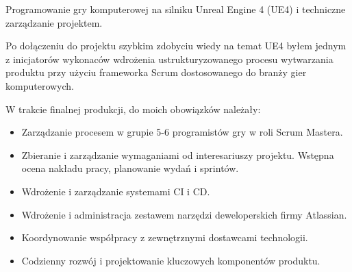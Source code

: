 \begin{rubric}{}
{	Programowanie gry komputerowej na silniku Unreal Engine 4 (UE4) i techniczne zarządzanie projektem.

	Po dołączeniu do projektu szybkim zdobyciu wiedy na temat UE4 byłem jednym z inicjatorów wykonaców
	wdrożenia ustrukturyzowanego procesu wytwarzania produktu przy użyciu frameworka Scrum dostosowanego
	do branży gier komputerowych.

	W trakcie finalnej produkcji, do moich obowiązków należały:
	\begin{itemize}
		\item Zarządzanie procesem w grupie 5-6 programistów gry w roli Scrum Mastera.
		\item Zbieranie i zarządzanie wymaganiami od interesariuszy projektu. Wstępna ocena nakładu
		pracy, planowanie wydań i sprintów.
		\item Wdrożenie i zarządzanie systemami CI i CD.
		\item Wdrożenie i administracja zestawem narzędzi deweloperskich firmy Atlassian.
		\item Koordynowanie współpracy z zewnętrznymi dostawcami technologii.
		\item Codzienny rozwój i projektowanie kluczowych komponentów produktu.
	\end{itemize}
	}
\entry*[2012.08 -- 2013.10]
\end{rubric}
